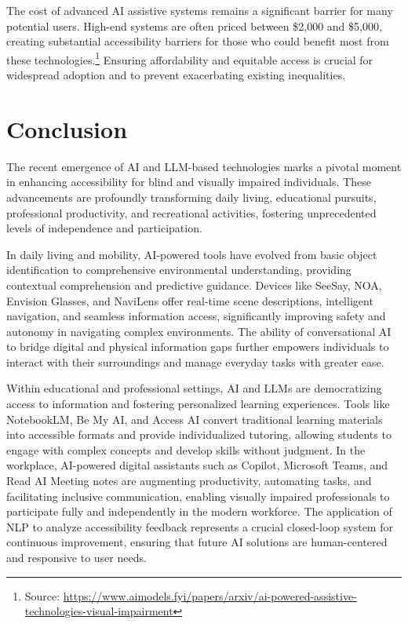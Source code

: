 The cost of advanced AI assistive systems remains a significant barrier for many potential users. High-end systems are often priced between \$2,000 and \$5,000, creating substantial accessibility barriers for those who could benefit most from these technologies.\footnote{Source: \url{https://www.aimodels.fyi/papers/arxiv/ai-powered-assistive-technologies-visual-impairment}} Ensuring affordability and equitable access is crucial for widespread adoption and to prevent exacerbating existing inequalities.

\section{Conclusion}

The recent emergence of AI and LLM-based technologies marks a pivotal moment in enhancing accessibility for blind and visually impaired individuals. These advancements are profoundly transforming daily living, educational pursuits, professional productivity, and recreational activities, fostering unprecedented levels of independence and participation.

In daily living and mobility, AI-powered tools have evolved from basic object identification to comprehensive environmental understanding, providing contextual comprehension and predictive guidance. Devices like SeeSay, NOA, Envision Glasses, and NaviLens offer real-time scene descriptions, intelligent navigation, and seamless information access, significantly improving safety and autonomy in navigating complex environments. The ability of conversational AI to bridge digital and physical information gaps further empowers individuals to interact with their surroundings and manage everyday tasks with greater ease.

Within educational and professional settings, AI and LLMs are democratizing access to information and fostering personalized learning experiences. Tools like NotebookLM, Be My AI, and Access AI convert traditional learning materials into accessible formats and provide individualized tutoring, allowing students to engage with complex concepts and develop skills without judgment. In the workplace, AI-powered digital assistants such as Copilot, Microsoft Teams, and Read AI Meeting notes are augmenting productivity, automating tasks, and facilitating inclusive communication, enabling visually impaired professionals to participate fully and independently in the modern workforce. The application of NLP to analyze accessibility feedback represents a crucial closed-loop system for continuous improvement, ensuring that future AI solutions are human-centered and responsive to user needs.

